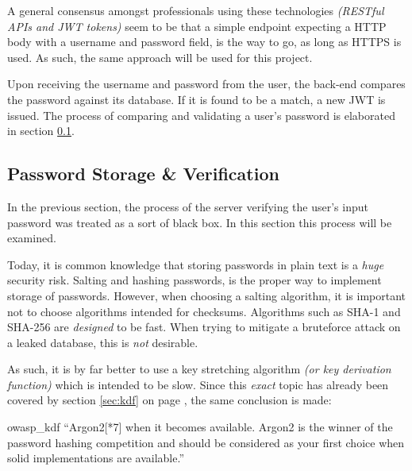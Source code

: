 			A general consensus amongst professionals using these technologies \emph{(RESTful APIs and JWT tokens)} seem to be that a simple endpoint expecting a HTTP body with a username and password field, is the way to go, as long as HTTPS is used\cite{jwt.io,auth0_jwt,tkalec}. As such, the same approach will be used for this project.

			Upon receiving the username and password from the user, the back-end compares the password against its database. If it is found to be a match, a new JWT is issued. The process of comparing and validating a user's password is elaborated in section \ref{sec:password}.

		\subsection{Password Storage \& Verification}
			\label{sec:password}
			In the previous section, the process of the server verifying the user's input password was treated as a sort of black box. In this section this process will be examined.

			Today, it is common knowledge that storing passwords in plain text is a \emph{huge} security risk. Salting and hashing passwords, is the proper way to implement storage of passwords. However, when choosing a salting algorithm, it is important not to choose algorithms intended for checksums. Algorithms such as SHA-1 and SHA-256 are \emph{designed} to be fast. When trying to mitigate a bruteforce attack on a leaked database, this is \emph{not} desirable.

			As such, it is by far better to use a key stretching algorithm \emph{(or key derivation function)} which is intended to be slow. Since this \emph{exact} topic has already been covered by section \ref{sec:kdf} on page \pageref{sec:kdf}, the same conclusion is made:
			\begin{citequote}{owasp_kdf}
				``Argon2[*7] when it becomes available. Argon2 is the winner of the password hashing competition and should be considered as your first choice when solid implementations are available.''
			\end{citequote}

